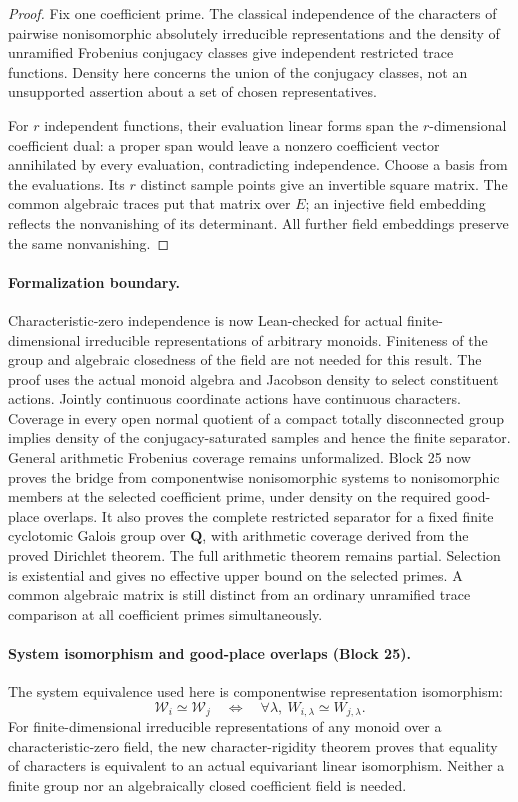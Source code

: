 \documentclass[11pt]{article}
\theoremstyle{definition}
\theoremstyle{remark}
\newcommand{\Q}{\mathbf Q}
\begin{document}
\begin{proof}
Fix one coefficient prime. The classical independence of the characters of
pairwise nonisomorphic absolutely irreducible representations and the density
of unramified Frobenius conjugacy classes give independent restricted trace
functions. Density here concerns the union of the conjugacy classes, not an
unsupported assertion about a set of chosen representatives.

For $r$ independent functions, their evaluation linear forms span the
$r$-dimensional coefficient dual: a proper span would leave a nonzero
coefficient vector annihilated by every evaluation, contradicting independence.
Choose a basis from the evaluations. Its $r$ distinct sample points give an
invertible square matrix. The common algebraic traces put that matrix over
$E$; an injective field embedding reflects the nonvanishing of its determinant.
All further field embeddings preserve the same nonvanishing.
\end{proof}

\paragraph{Formalization boundary.}
Characteristic-zero independence is now Lean-checked for actual finite-dimensional
irreducible representations of arbitrary monoids. Finiteness of the group and
algebraic closedness of the field are not needed for this result. The proof
uses the actual monoid algebra and Jacobson density to select constituent
actions. Jointly continuous coordinate actions have continuous characters.
Coverage in every open normal quotient of a compact totally disconnected group
implies density of the conjugacy-saturated samples and hence the finite separator.
General arithmetic Frobenius coverage remains unformalized. Block 25 now proves
the bridge from componentwise nonisomorphic systems to nonisomorphic members
at the selected coefficient prime, under density on the required good-place
overlaps. It also proves the complete restricted separator for a fixed finite
cyclotomic Galois group over $\Q$, with arithmetic coverage derived from the
proved Dirichlet theorem. The full arithmetic theorem remains partial. Selection
is existential and gives no effective upper bound on the selected primes.
A common algebraic matrix is still distinct from an ordinary unramified trace
comparison at all coefficient primes simultaneously.

\paragraph{System isomorphism and good-place overlaps (Block 25).}
The system equivalence used here is componentwise representation isomorphism:
\[
 \mathscr W_i\simeq\mathscr W_j
 \quad\Longleftrightarrow\quad
 \forall\lambda,\ W_{i,\lambda}\simeq W_{j,\lambda}.
\]
For finite-dimensional irreducible representations of any monoid over a
characteristic-zero field, the new character-rigidity theorem proves that
equality of characters is equivalent to an actual equivariant linear isomorphism.
Neither a finite group nor an algebraically closed coefficient field is needed.
\end{document}
